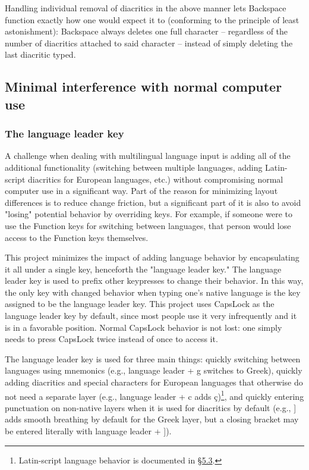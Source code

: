 \documentclass[11pt]{article}
\begin{document}
Handling individual removal of diacritics in the above manner lets Backspace function exactly how one would expect it to (conforming to the principle of least astonishment): Backspace always deletes one full character -- regardless of the number of diacritics attached to said character -- instead of simply deleting the last diacritic typed.

\subsection{Minimal interference with normal computer use}
\label{sec:org93492a6}

\subsubsection{The language leader key}
\label{sec:org3588e31}

A challenge when dealing with multilingual language input is adding all of the additional functionality (switching between multiple languages, adding Latin-script diacritics for European languages, etc.) without compromising normal computer use in a significant way. Part of the reason for minimizing layout differences is to reduce change friction, but a significant part of it is also to avoid "losing" potential behavior by overriding keys. For example, if someone were to use the Function keys for switching between languages, that person would lose access to the Function keys themselves.

This project minimizes the impact of adding language behavior by encapsulating it all under a single key, henceforth the "language leader key." The language leader key is used to prefix other keypresses to change their behavior. In this way, the only key with changed behavior when typing one's native language is the key assigned to be the language leader key. This project uses CapsLock as the language leader key by default, since most people use it very infrequently and it is in a favorable position. Normal CapsLock behavior is not lost: one simply needs to press CapsLock twice instead of once to access it.

The language leader key is used for three main things: quickly switching between languages using mnemonics (e.g., language leader + g switches to Greek), quickly adding diacritics and special characters for European languages that otherwise do not need a separate layer (e.g., language leader + c adds ç)\footnote{Latin-script language behavior is documented in \hyperref[sec:org805c871]{§5.3}.}, and quickly entering punctuation on non-native layers when it is used for diacritics by default (e.g., ] adds smooth breathing by default for the Greek layer, but a closing bracket may be entered literally with language leader + ]).
\end{document}

